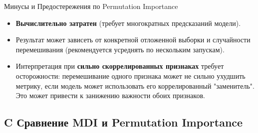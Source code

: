 \begin{alerttextbox}{Минусы и Предостережения по Permutation Importance}
    \begin{itemize}[nosep, leftmargin=*]
        \item \textbf{Вычислительно затратен} (требует многократных предсказаний модели).
        \item Результат может зависеть от конкретной отложенной выборки и случайности перемешивания (рекомендуется усреднять по нескольким запускам).
        \item Интерпретация при \textbf{сильно скоррелированных признаках} требует осторожности: перемешивание одного признака может не сильно ухудшить метрику, если модель может использовать его коррелированный "заменитель". Это может привести к занижению важности обоих признаков.
    \end{itemize}
\end{alerttextbox}

\subsection{C Сравнение MDI и Permutation Importance}

